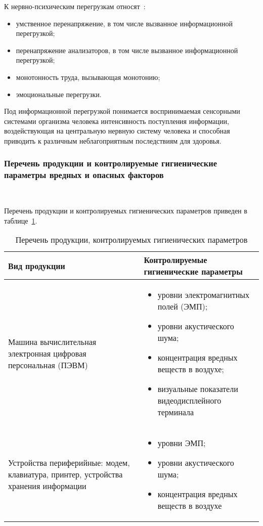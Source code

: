 К нервно-психическим перегрузкам относят~\cite{gost_12.0.003-2015}:
\begin{itemize}
 \item умственное перенапряжение, в том числе вызванное информационной перегрузкой;
 \item перенапряжение анализаторов, в том числе вызванное информационной перегрузкой;
 \item монотонность труда, вызывающая монотонию;
 \item эмоциональные перегрузки.
\end{itemize}

Под информационной перегрузкой понимается воспринимаемая сенсорными системами организма
человека интенсивность поступления информации, воздействующая на центральную нервную систему человека
и способная приводить к различным неблагоприятным последствиям для здоровья.

\subsubsection{Перечень продукции и контролируемые гигиенические параметры вредных и опасных факторов}


~\cite{sanpin_2.4.1340-03}

Перечень продукции и контролируемых гигиенических параметров приведен в таблице~\ref{tab:life_1}.

\begin{table}[h!]
\caption{ Перечень продукции, контролируемых гигиенических параметров }
\label{tab:life_1}
\begin{center}
\begin{tabularx}{\linewidth}{|X|X|}
\hline
Вид продукции & Контролируемые гигиенические параметры\\
\hline
\item Машина вычислительная электронная цифровая персональная (ПЭВМ) & 
\begin{itemize}
 \item уровни электромагнитных полей (ЭМП);
 \item уровни акустического шума;
 \item концентрация вредных веществ в воздухе;
 \item визуальные показатели видеодисплейного терминала
\end{itemize}									     
\\
\hline
\item Устройства периферийные: модем, клавиатура, принтер, устройства хранения информации & 
\begin{itemize}
 \item уровни ЭМП;
 \item уровни акустического шума;
 \item концентрация вредных веществ в воздухе
\end{itemize}
 \\
\hline
\end{tabularx}
\end{center}
\end{table}




